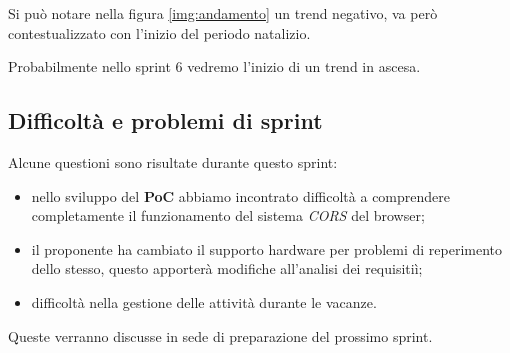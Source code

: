 Si può notare nella figura \ref{img:andamento} un trend negativo, va però contestualizzato con l'inizio del periodo natalizio.

Probabilmente nello sprint 6 vedremo l'inizio di un trend in ascesa.

\subsection{Difficoltà e problemi di sprint}

Alcune questioni sono risultate durante questo sprint:

\begin{itemize}
    \item nello sviluppo del \textbf{PoC} abbiamo incontrato difficoltà a comprendere completamente il funzionamento del sistema \textit{CORS} del browser;
    \item il proponente ha cambiato il supporto hardware per problemi di reperimento dello stesso, questo apporterà modifiche all'analisi dei requisitiì;
    \item difficoltà nella gestione delle attività durante le vacanze.
\end{itemize}

Queste verranno discusse in sede di preparazione del prossimo sprint.

